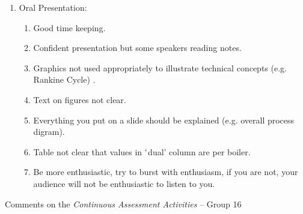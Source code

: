 \documentclass[14pt,twoside]{report}
\begin{document}
\begin{enumerate}
\item Oral Presentation:
\begin{enumerate}
%
\item Good time keeping.
%
\item Confident presentation but some speakers reading notes.
%
\item Graphics not used appropriately to illustrate technical concepts (e.g. Rankine Cycle) .
%
\item Text on figures not clear.
%
\item Everything you put on a slide should be explained (e.g. overall process digram).
%
\item Table not clear that values in $\lq$dual' column are per boiler.
%
\item Be more enthusiastic, try to burst with enthusiasm, if you are not, your audience will not be enthusiastic to listen to you.
%
\end{enumerate}

\end{enumerate}


\clearpage


\clearpage



\bigskip

\begin{center}
  {\Large Comments on the {\it Continuous Assessment Activities} -- Group 16}
\end{center}
\end{document}
